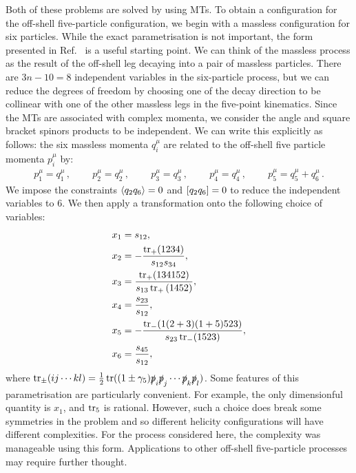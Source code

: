 \documentclass[main.tex]{subfiles}
\begin{document}
Both of these problems are solved by using MTs. To obtain a configuration for the off-shell five-particle configuration, we begin with a massless configuration for six particles. While the exact parametrisation is not important, the form presented in Ref.~\cite{Badger:2016uuq} is a useful starting point. We can think of the massless process as the result of the off-shell leg decaying into a pair of massless particles. There are $3n-10 = 8$ independent variables in the six-particle process, but we can reduce the degrees of freedom by choosing one of the decay direction to be collinear with one of the other massless legs in the five-point kinematics. Since the MTs are associated with complex momenta, we consider the angle and square bracket spinors products to be independent. We can write this explicitly as follows: the six massless momenta $q_i^\mu$ are related to the off-shell five particle momenta $p_i^\mu$ by:
\begin{align}
  p_1^\mu = q_1^\mu\,, \ \qquad 
  p_2^\mu = q_2^\mu\,, \ \qquad 
  p_3^\mu = q_3^\mu\,, \ \qquad
  p_4^\mu = q_4^\mu \,, \ \qquad
  p_5^\mu = q_5^\mu+q_6^\mu \,.
\end{align}
We impose the constraints $\langle q_2q_6\rangle = 0 $ and $[q_2q_6] = 0$ to reduce the independent variables to 6. 
We then apply a transformation onto the following choice of variables:
\begin{align} \label{eq:mtvardefs}
  x_1 &= s_{12}, \nonumber \\
  x_2 &= -\frac{\operatorname{\rm tr}_+(1234)}{s_{12}s_{34}}, \nonumber \\
  x_3 &= \frac{\operatorname{\rm tr}_+(134152)}{s_{13}\operatorname{\rm tr}_+{(1452)}}, \nonumber \\
  x_4 &= \frac{s_{23}}{s_{12}},  \\
  x_5 &= -\frac{\operatorname{\rm tr}_-(1(2+3)(1+5)523)}{s_{23}\operatorname{\rm tr}_-(1523)}, \nonumber \\
  x_6 &= \frac{s_{45}}{s_{12}}, \nonumber
\end{align}
where $\operatorname{\rm tr}_{\pm}(ij \cdots kl) = \frac{1}{2} \operatorname{\rm tr}((1\pm\gamma_5)\slashed{p}_i\slashed{p}_j \cdots\slashed{p}_k\slashed{p}_l)$.
Some features of this parametrisation are particularly convenient. For example, the only dimensionful 
quantity is $x_1$, and $\operatorname{\rm tr}_5$ is rational. However, such a choice does break some symmetries
in the problem and so different helicity configurations will have different complexities. For the
process considered here, the complexity was manageable using this form.
Applications to other off-shell five-particle processes may require further thought. 
\end{document}
